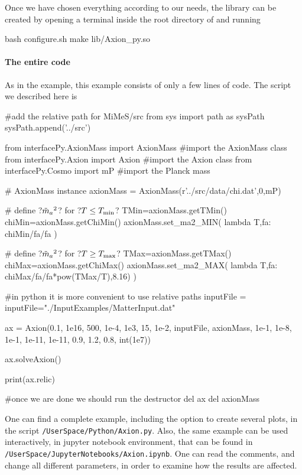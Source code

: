 \documentclass[11pt,a4paper]{article}
\begin{document}
Once we have chosen everything according to our needs, the library can be created by opening a terminal inside the root directory of \mimes and running
%
\begin{py}
	bash configure.sh
	make lib/Axion_py.so
\end{py}
%

\paragraph{The entire code}
%
As in the \CPP example, this example consists of only a few lines of code. The script we described here is
%
\begin{py}
	#add the relative path for MiMeS/src
	from sys import path as sysPath
	sysPath.append('../src')	
	
	from interfacePy.AxionMass import AxionMass #import the AxionMass class
	from interfacePy.Axion import Axion #import the Axion class
	from interfacePy.Cosmo import mP #import the Planck mass

	# AxionMass instance
	axionMass = AxionMass(r'../src/data/chi.dat',0,mP)
	
	# define ?$\tilde m_{a}{}^2$? for ?$T\leq T_{\rm min}$?
	TMin=axionMass.getTMin() 
	chiMin=axionMass.getChiMin()
	axionMass.set_ma2_MIN( lambda T,fa: chiMin/fa/fa )

	# define ?$\tilde m_{a}{}^2$? for ?$T\geq T_{\rm max}$?
	TMax=axionMass.getTMax() 
	chiMax=axionMass.getChiMax()
	axionMass.set_ma2_MAX( lambda T,fa: chiMax/fa/fa*pow(TMax/T),8.16) )
	
	#in python it is more convenient to use relative paths
	inputFile = inputFile="./InputExamples/MatterInput.dat"  
	
	ax = Axion(0.1, 1e16, 500, 1e-4, 1e3, 15, 1e-2, inputFile, axionMass, 
	1e-1, 1e-8, 1e-1, 1e-11, 1e-11, 0.9, 1.2, 0.8, int(1e7))

	ax.solveAxion()
	
	print(ax.relic)
	
	#once we are done we should run the destructor
	del ax
	del axionMass
\end{py} 


One can find a complete example, including the option to create several plots, in the script {\tt \mimes/UserSpace/Python/Axion.py}. Also, the same example can be used interactively, in jupyter notebook environment, that can be found in {\tt \mimes/UserSpace/JupyterNotebooks/Axion.ipynb}. One can read the comments, and change all different parameters, in order to examine how the results are affected. 
\end{document}
